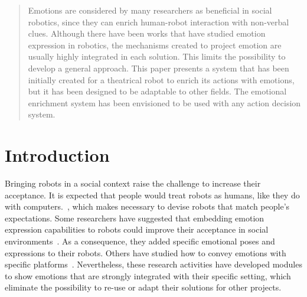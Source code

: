 \documentclass{sig-alternate-05-2015}
\begin{document}
\maketitle
\begin{abstract}
Emotions are considered by many researchers as beneficial in social robotics, since they can enrich human-robot interaction with non-verbal clues. Although there have been works that have studied emotion expression in robotics, the mechanisms created to project emotion are usually highly integrated in each solution. This limits the possibility to develop a general approach. 
This paper presents a system that has been initially created for a theatrical robot to enrich its actions with emotions, but it has been designed to be adaptable to other fields. The emotional enrichment system has been envisioned to be used with any action decision system. 
\end{abstract}

\printccsdesc



\section{Introduction}

Bringing robots in a social context raise the challenge to increase their acceptance. %
It is expected that people would treat robots as humans, like they do with computers.~\cite{Reeves1996}, which makes necessary to devise robots that match people's expectations. Some researchers have suggested that embedding emotion expression capabilities to robots could improve their acceptance in social environments~\cite{Pavia2014}. As a consequence, they added specific emotional poses and expressions to their robots. Others have studied how to convey emotions with specific platforms~\cite{Li2011,Brown2014}. Nevertheless, these research activities have developed modules to show emotions that are strongly integrated with their specific setting, which eliminate the possibility to re-use or adapt their solutions for other projects. 
 
\end{document}
